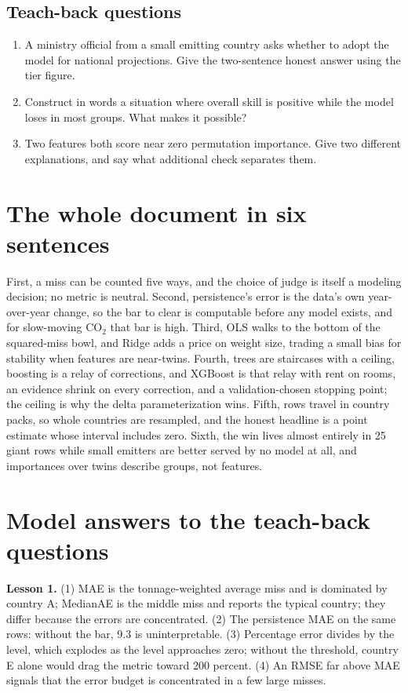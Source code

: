 \documentclass[11pt]{article}
\begin{document}
\subsection{Teach-back questions}

\begin{enumerate}
\item A ministry official from a small emitting country asks whether to
adopt the model for national projections. Give the two-sentence honest
answer using the tier figure.
\item Construct in words a situation where overall skill is positive
while the model loses in most groups. What makes it possible?
\item Two features both score near zero permutation importance. Give two
different explanations, and say what additional check separates them.
\end{enumerate}

\section{The whole document in six sentences}

First, a miss can be counted five ways, and the choice of judge is itself
a modeling decision; no metric is neutral. Second, persistence's error is
the data's own year-over-year change, so the bar to clear is computable
before any model exists, and for slow-moving CO$_2$ that bar is high.
Third, OLS walks to the bottom of the squared-miss bowl, and Ridge adds a
price on weight size, trading a small bias for stability when features
are near-twins. Fourth, trees are staircases with a ceiling, boosting is
a relay of corrections, and XGBoost is that relay with rent on rooms, an
evidence shrink on every correction, and a validation-chosen stopping
point; the ceiling is why the delta parameterization wins. Fifth, rows
travel in country packs, so whole countries are resampled, and the honest
headline is a point estimate whose interval includes zero. Sixth, the win
lives almost entirely in 25 giant rows while small emitters are better
served by no model at all, and importances over twins describe groups,
not features.

\appendix

\section{Model answers to the teach-back questions}

\textbf{Lesson 1.} (1) MAE is the tonnage-weighted average miss and is
dominated by country A; MedianAE is the middle miss and reports the
typical country; they differ because the errors are concentrated. (2) The
persistence MAE on the same rows: without the bar, 9.3 is uninterpretable.
(3) Percentage error divides by the level, which explodes as the level
approaches zero; without the threshold, country E alone would drag the
metric toward 200 percent. (4) An RMSE far above MAE signals that the
error budget is concentrated in a few large misses.
\end{document}
